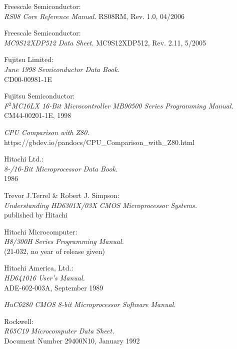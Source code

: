  Freescale Semiconductor: \\
                  {\em RS08 Core Reference Manual.\/}
                  RS08RM, Rev. 1.0, 04/2006     

 Freescale Semiconductor: \\
                    {\em MC9S12XDP512 Data Sheet.\/}
                    MC9S12XDP512, Rev. 2.11, 5/2005

 Fujitsu Limited: \\
                    {\em June 1998 Semiconductor Data Book.\/} \\
                    CD00-00981-1E

 Fujitsu Semiconductor: \\
                    {\em F$^2$MC16LX 16-Bit Microcontroller MB90500 Series
                         Programming Manual.\/} \\
                    CM44-00201-1E, 1998

 {\em CPU Comparison with Z80.\/} \\
                https://gbdev.io/pandocs/CPU\_Comparison\_with\_Z80.html

 Hitachi Ltd.: \\
                 {\em 8-/16-Bit Microprocessor Data Book.\/} \\
                 1986

 Trevor J.Terrel \& Robert J. Simpson: \\
                {\em Understanding HD6301X/03X CMOS Microprocessor
                 Systems.\/} \\
		published by Hitachi

 Hitachi Microcomputer: \\
                {\em H8/300H Series Programming Manual.\/} \\
                (21-032, no year of release given)

 Hitachi America, Ltd.: \\
                {\em HD641016 User's Manual.\/} \\
                ADE-602-003A, September 1989

 {\em HuC6280 CMOS 8-bit Microprocessor Software Manual.\/}

 Rockwell: \\
                {\em R65C19 Microcomputer Data Sheet.\/} \\
                Document Number 29400N10, January 1992

